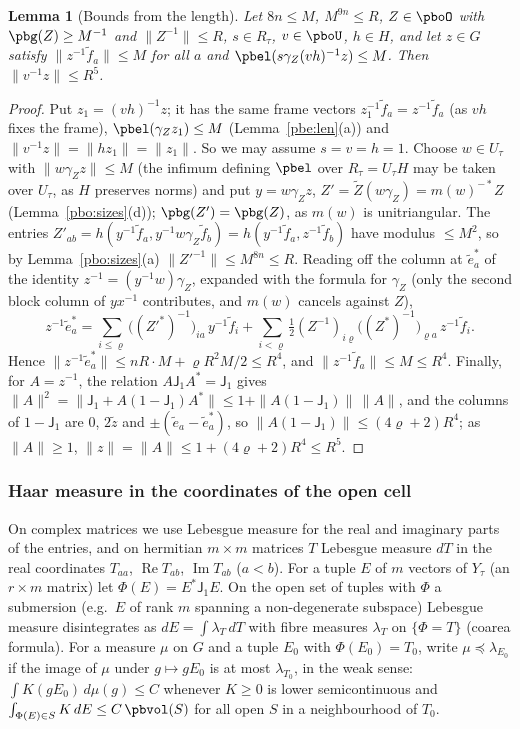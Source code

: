 \documentclass[10pt]{amsart}
\newtheorem{lemma}[theorem]{Lemma}
\theoremstyle{definition}
\theoremstyle{remark}
\newcommand{\Rel}{\operatorname{Re}}
\newcommand{\Iml}{\operatorname{Im}}
\begin{document}
\begin{lemma}[Bounds from the length]\label{pbo:norm-z}
Let $8n\le M$, $M^{9n}\le R$, $Z\in\pboO$ with $\pbg(Z)\ge M^{-1}$ and $\|Z^{-1}\|\le R$, $s\in R_\tau$,
$v\in\pboU$, $h\in H$, and let $z\in G$ satisfy $\|z^{-1}\tilde f_a\|\le M$ for all $a$ and $\pbel(s\gamma_Z
(vh)^{-1}z)\le M$. Then $\|v^{-1}z\|\le R^5$.
\end{lemma}
\begin{proof}
Put $z_1=(vh)^{-1}z$; it has the same frame vectors $z_1^{-1}\tilde f_a=z^{-1}\tilde f_a$ (as $vh$ fixes
the frame), $\pbel(\gamma_Zz_1)\le M$ (Lemma~\ref{pbe:len}(a)) and $\|v^{-1}z\|=\|hz_1\|=\|z_1\|$. So we
may assume $s=v=h=1$. Choose $w\in U_\tau$ with $\|w\gamma_Zz\|\le M$ (the infimum defining $\pbel$ over
$R_\tau=U_\tau H$ may be taken over $U_\tau$, as $H$ preserves norms) and put $y=w\gamma_Zz$, $Z'=\tilde Z(
w\gamma_Z)=m(w)^{-*}Z$ (Lemma~\ref{pbo:sizes}(d)); $\pbg(Z')=\pbg(Z)$, as $m(w)$ is unitriangular. The
entries $Z'_{ab}=h(y^{-1}\tilde f_a,y^{-1}w\gamma_Z\tilde f_b)=h(y^{-1}\tilde f_a,z^{-1}\tilde f_b)$ have
modulus $\le M^2$, so by Lemma~\ref{pbo:sizes}(a) $\|Z'^{-1}\|\le M^{8n}\le R$. Reading off the
column at $\tilde e^*_a$ of the identity $z^{-1}=(y^{-1}w)\gamma_Z$, expanded with the formula for
$\gamma_Z$ (only the second block column of $yx^{-1}$ contributes, and $m(w)$ cancels against $Z$),
\[
z^{-1}\tilde e^*_a=\sum_{i\le\varrho}\bigl((Z'^*)^{-1}\bigr)_{ia}\,y^{-1}\tilde f_i+\sum_{i<\varrho}\tfrac12
(Z^{-1})_{i\varrho}\bigl((Z^*)^{-1}\bigr)_{\varrho a}\,z^{-1}\tilde f_i .
\]
Hence $\|z^{-1}\tilde e^*_a\|\le nR\cdot M+\varrho R^2M/2\le R^4$, and $\|z^{-1}\tilde f_a\|\le M\le R^4$.
Finally, for $A=z^{-1}$, the relation $A\mathsf J_1A^*=\mathsf J_1$ gives $\|A\|^2=\|\mathsf J_1+A(1-\mathsf
J_1)A^*\|\le1+\|A(1-\mathsf J_1)\|\,\|A\|$, and the columns of $1-\mathsf J_1$ are $0$, $2\tilde z$ and
$\pm(\tilde e_a-\tilde e^*_a)$, so $\|A(1-\mathsf J_1)\|\le(4\varrho+2)R^4$; as $\|A\|\ge1$, $\|z\|=\|A\|
\le1+(4\varrho+2)R^4\le R^5$.
\end{proof}

\subsubsection{Haar measure in the coordinates of the open cell}\label{pbo:ss-GF}

On complex matrices we use Lebesgue measure for the real and imaginary parts of the entries, and on
hermitian $m\times m$ matrices $T$ Lebesgue measure $dT$ in the real coordinates $T_{aa}$, $\Rel T_{ab}$,
$\Iml T_{ab}$ ($a<b$). For a tuple $E$ of $m$ vectors of $Y_\tau$ (an $r\times m$ matrix) let $\Phi(E)=
E^*\mathsf J_1E$. On the open set of tuples with $\Phi$ a submersion (e.g.\ $E$ of rank $m$ spanning a
non-degenerate subspace) Lebesgue measure disintegrates as $dE=\int\lambda_T\,dT$ with fibre measures
$\lambda_T$ on $\{\Phi=T\}$ (coarea formula). For a measure $\mu$ on $G$ and a tuple $E_0$ with
$\Phi(E_0)=T_0$, write $\mu\preceq\lambda_{E_0}$ if the image of $\mu$ under $g\mapsto gE_0$ is at most
$\lambda_{T_0}$, in the weak sense: $\int K(gE_0)\,d\mu(g)\le C$ whenever $K\ge0$ is lower semicontinuous
and $\int_{\Phi(E)\in S}K\,dE\le C\,\pbvol(S)$ for all open $S$ in a neighbourhood of $T_0$.
\end{document}
